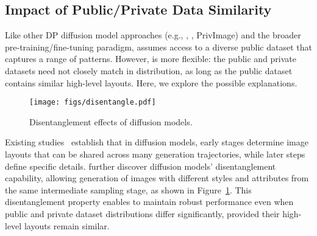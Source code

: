 



\subsection{Impact of Public/Private Data Similarity}

Like other DP diffusion model approaches (e.g., \dpdm, \dpldm, {\sc PrivImage}) and the broader pre-training/fine-tuning paradigm, \system assumes access to a diverse public dataset that captures a range of patterns. However, \system is more flexible: the public and private datasets need not closely match in distribution, as long as the public dataset contains similar high-level layouts. Here, we explore the possible explanations.


\begin{figure}[!ht]
    \centering
    \texttt{[image: figs/disentangle.pdf]}
    \caption{Disentanglement effects of diffusion models.}
    \label{fig:disentangle}
\end{figure}


Existing studies~\citep{sdedit,zhang2023redi} establish that in diffusion models, early stages determine image layouts that can be shared across many generation trajectories, while later steps define specific details. \cite{disentangle} further discover diffusion models' disentanglement capability, allowing generation of images with different styles and attributes from the same intermediate sampling stage, as shown in Figure~\ref{fig:disentangle}. This disentanglement property enables \system to maintain robust performance even when public and private dataset distributions differ significantly, provided their high-level layouts remain similar.

